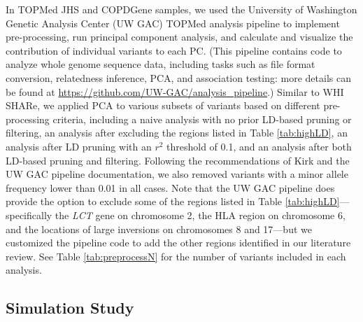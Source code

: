\documentclass[12pt]{article}
\begin{document}
In TOPMed JHS and COPDGene samples, we used the University of Washington Genetic Analysis Center (UW GAC) TOPMed analysis pipeline \citep{GACpipeline} to implement pre-processing, run principal component analysis, and calculate and visualize the contribution of individual variants to each PC. 
(This pipeline contains code to analyze whole genome sequence data,  including tasks such as file format conversion, relatedness inference, PCA, and association testing: more details can be found at \href{https://github.com/UW-GAC/analysis_pipeline}{https://github.com/UW-GAC/analysis\_pipeline}.)
Similar to WHI SHARe, we applied PCA to various subsets of variants based on different pre-processing criteria, including a naive analysis with no prior LD-based pruning or filtering, an analysis after excluding the regions listed in Table \ref{tab:highLD}, an analysis after LD pruning with an $r^2$ threshold of 0.1, and an analysis after both LD-based pruning and filtering.
Following the recommendations of Kirk \citep{JKdissertation} and the UW GAC pipeline documentation, we also removed variants with a minor allele frequency lower than 0.01 in all cases.
Note that the UW GAC pipeline does provide the option to exclude some of the regions listed in Table \ref{tab:highLD}---specifically the \textit{LCT} gene on chromosome 2, the HLA region on chromosome 6, and the locations of large inversions on chromosomes 8 and 17---but we customized the pipeline code to add the other regions identified in our literature review. 
See Table \ref{tab:preprocessN} for the number of variants included in each analysis.




\subsection{Simulation Study}
\end{document}
